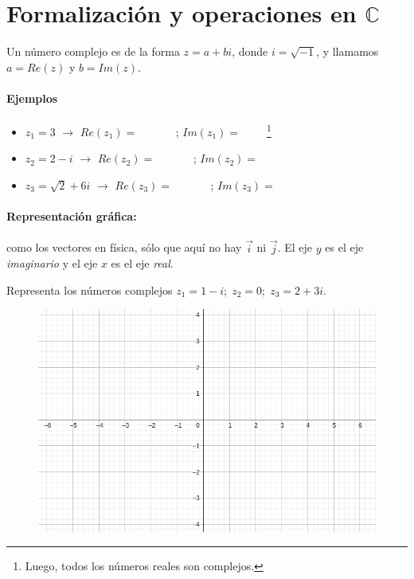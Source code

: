 \section{Formalización y operaciones en $ℂ$}

Un número complejo es de la forma $z=a+bi$, donde $i=\sqrt{-1}$, y llamamos $a=Re(z)$ y $b=Im(z)$. 

\paragraph{Ejemplos}
\begin{itemize}
	\item $z_1 = 3$ $\to$ $Re(z_1) = \;\;\quad\quad\;\;\;$; $Im(z_1) = \;\;\;\;\;\;\;$ \footnote{Luego, todos los números reales son complejos.}
	\item $z_2 = 2-i$ $\to$ $Re(z_2) = \;\;\quad\quad\;\;\;$; $Im(z_2) = \;\;\;\;\;\;\;$
	\item $z_3 = \sqrt{2}+6i$ $\to$ $Re(z_3) = \;\;\quad\quad\;\;\;$; $Im(z_3) = \;\;\;\;\;\;\;$
\end{itemize}



\paragraph{Representación gráfica:} como los vectores en física, sólo que aquí no hay $\vec{i}$ ni $\vec{j}$. El eje $y$ es el eje \textit{imaginario} y el eje $x$ es el eje \textit{real}.

\begin{example} Representa los números complejos $z_1 = 1-i;\;z_2 = 0;\; z_3 = 2+3i$.

\begin{figure}[hbtp]
\centering
\includegraphics[scale=0.5]{../grid.png}
\end{figure}
\end{example}

